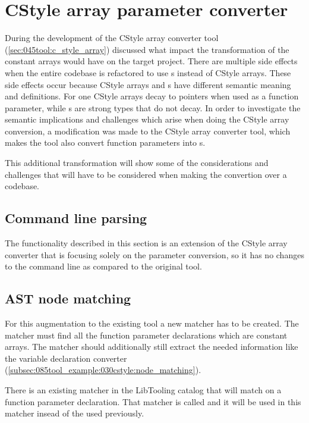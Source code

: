
\section{CStyle array parameter converter}

During the development of the CStyle array converter tool (\cref{sec:045tool:c_style_array}) discussed what impact the transformation of the constant arrays would have on the target project. There are multiple side effects when the entire codebase is refactored to use s instead of CStyle arrays. These side effects occur because CStyle arrays and s have different semantic meaning and definitions. For one CStyle arrays decay to pointers when used as a function parameter, while s are strong types that do not decay. In order to investigate the semantic implications and challenges which arise when doing the CStyle array conversion, a modification was made to the CStyle array converter tool, which makes the tool also convert function parameters into s.

This additional transformation will show some of the considerations and challenges that will have to be considered when making the convertion over a codebase.

\subsection{Command line parsing}

The functionality described in this section is an extension of the CStyle array converter that is focusing solely on the parameter conversion, so it has no changes to the command line as compared to the original tool.

\subsection{AST node matching}

For this augmentation to the existing tool a new matcher has to be created. The matcher must find all the function parameter declarations which are constant arrays. The matcher should additionally still extract the needed information like the variable declaration converter (\cref{subsec:085tool_example:030cstyle:node_matching}).

There is an existing matcher in the LibTooling catalog that will match on a function parameter declaration. That matcher is called  and it will be used in this matcher insead of the  used previously.

